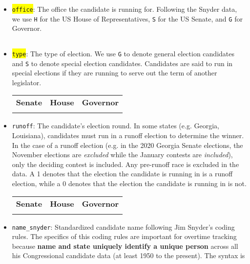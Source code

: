 \documentclass[12pt]{article}
\begin{document}
\begin{itemize}[leftmargin=*]

\item \colorbox{yellow}{\texttt{office}}: The office the candidate is running for. Following the Snyder data, we use \texttt{H} for the US House of Representatives, \texttt{S} for the US Senate, and \texttt{G} for Governor. 

    \begin{tabularx}{\linewidth}{C}
    
    \end{tabularx}
			

\item \colorbox{yellow}{\texttt{type}}: The type of election. We use \texttt{G} to denote general election candidates and \texttt{S} to denote special election candidates. Candidates are said to run in special elections if they are running to serve out the term of another legislator. 

\begin{tabularx}{\linewidth}{CCC}
    \textbf{Senate} & \textbf{House} & \textbf{Governor}\\
     &  & 
\end{tabularx}

\item \texttt{runoff}: The candidate's election round. In some states (e.g. Georgia, Louisiana), candidates must run in a runoff election to determine the winner. In the case of a runoff election (e.g. in the 2020 Georgia Senate elections, the November elections are \textit{excluded} while the January contests are \textit{included}), only the deciding contest is included. Any pre-runoff race is excluded in the data. A 1 denotes that the election the candidate is running in is a runoff election, while a 0 denotes that the election the candidate is running in is not. 

\begin{tabularx}{\linewidth}{CCC}
    \textbf{Senate} & \textbf{House} & \textbf{Governor}\\
     &  & 
\end{tabularx}

\item \texttt{name\_snyder}: Standardized candidate name following Jim Snyder's coding rules. The
specifics of this coding rules are important for overtime tracking because
\textbf{name and state uniquely identify a unique person} across all his
Congressional candidate data (at least 1950 to the present). The syntax
is


\end{itemize}
\end{document}
